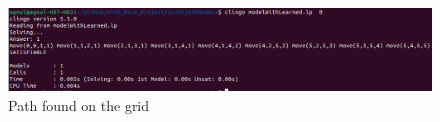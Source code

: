 \newpage
\begin{figure}
	\includegraphics[scale=0.45]{img/outputModel.png}
	\caption{Path found on the grid}\label{fig:asd3}
\end{figure}


\newpage